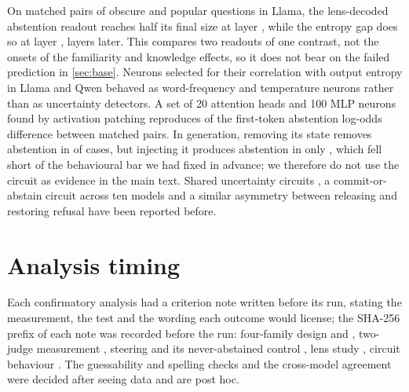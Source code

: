 \documentclass{article}
\begin{document}
On matched pairs of obscure and popular questions in Llama, the lens-decoded abstention readout reaches half its final size at layer \ltHedgeHalf, while the entropy gap does so at layer \ltEntHalf, \ltLead{} layers later. This compares two readouts of one contrast, not the onsets of the familiarity and knowledge effects, so it does not bear on the failed prediction in \cref{sec:base}. Neurons selected for their correlation with output entropy in Llama and Qwen behaved as word-frequency and temperature neurons \citep{stolfo2024confidence,gurnee2024universal} rather than as uncertainty detectors. A set of 20 attention heads and 100 MLP neurons found by activation patching \citep{wang2023ioi,syed2023attribution} reproduces \ciRecovery{} \ciRecoveryCI{} of the first-token abstention log-odds difference between matched pairs. In generation, removing its state removes abstention in \ciRemoveFlip{} of cases, but injecting it produces abstention in only \ciInjectFlip, which fell short of the behavioural bar we had fixed in advance; we therefore do not use the circuit as evidence in the main text. Shared uncertainty circuits \citep{teplica2025sciurus}, a commit-or-abstain circuit across ten models \citep{nguyen2026commit} and a similar asymmetry between releasing and restoring refusal \citep{liu2026broken} have been reported before.

\section{Analysis timing}
\label{app:timing}

Each confirmatory analysis had a criterion note written before its run, stating the measurement, the test and the wording each outcome would license; the SHA-256 prefix of each note was recorded before the run: four-family design \hashQwenFactorial{} and \hashGemmaMistralFactorial, two-judge measurement \hashHedgeMeasure, steering \hashSteering{} and its never-abstained control \hashNoHedge, lens study \hashLens, circuit behaviour \hashCircuit. The guessability and spelling checks and the cross-model agreement were decided after seeing data and are post hoc.
\end{document}
